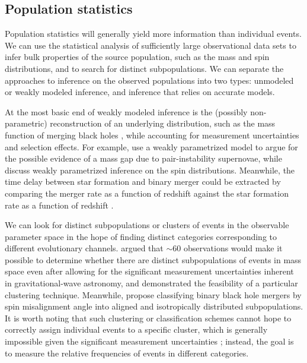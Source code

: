 \documentclass[iop,onecolumn]{revtex4}
\begin{document}
\subsection{Population statistics}

Population statistics will generally yield more information than individual events.  We can use the statistical analysis of sufficiently large observational data sets to infer bulk properties of the source population, such as the mass and spin distributions, and to search for distinct subpopulations.  We can separate the approaches to inference on the observed populations into two types: unmodeled or weakly modeled inference, and inference that relies on accurate models. 

At the most basic end of weakly modeled inference is the (possibly non-parametric) reconstruction of an underlying distribution, such as the mass function of merging black holes \citep{Mandel:2010stat,BBH:O1}, while accounting for measurement uncertainties and selection effects.  For example, \citet{Fishbach:2017mass} use a weakly parametrized model to argue for the possible evidence of a mass gap due to pair-instability supernovae, while \citet{TalbotThrane:2017} discuss weakly parametrized inference on the spin distributions.  Meanwhile, the time delay between star formation and binary merger could be extracted by comparing the merger rate as a function of redshift against the star formation rate as a function of redshift \citep{Mandel:2016select}.  

We can look for distinct subpopulations or clusters of events in the observable parameter space in the hope of finding distinct categories corresponding to different evolutionary channels.  \citet{Mandel:2015} argued that $\sim 60$ observations would make it possible to determine whether there are distinct subpopulations of events in mass space even after allowing for the significant measurement uncertainties inherent in gravitational-wave astronomy, and \citet{Mandel:2016cluster} demonstrated the feasibility of a particular clustering technique.  Meanwhile, \citet{Farr:2018} propose classifying binary black hole mergers by spin misalignment angle into aligned and isotropically distributed subpopulations.  It is worth noting that such clustering or classification schemes cannot hope to correctly assign individual events to a specific cluster, which is generally impossible given the significant measurement uncertainties \citep{Littenberg:2015}; instead, the goal is to measure the relative frequencies of events in different categories.
\end{document}
